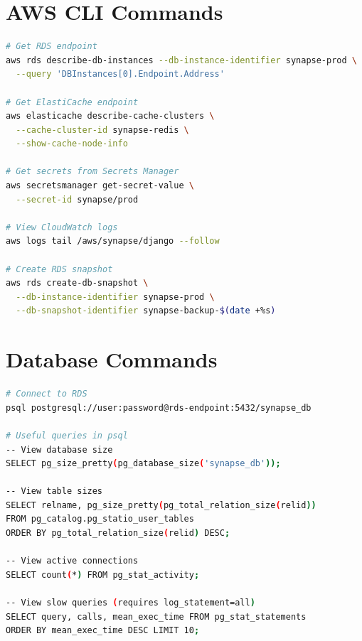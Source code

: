 \documentclass{report}
\begin{document}
\section{AWS CLI Commands}

\begin{lstlisting}[language=bash]
# Get RDS endpoint
aws rds describe-db-instances --db-instance-identifier synapse-prod \
  --query 'DBInstances[0].Endpoint.Address'

# Get ElastiCache endpoint
aws elasticache describe-cache-clusters \
  --cache-cluster-id synapse-redis \
  --show-cache-node-info

# Get secrets from Secrets Manager
aws secretsmanager get-secret-value \
  --secret-id synapse/prod

# View CloudWatch logs
aws logs tail /aws/synapse/django --follow

# Create RDS snapshot
aws rds create-db-snapshot \
  --db-instance-identifier synapse-prod \
  --db-snapshot-identifier synapse-backup-$(date +%s)
\end{lstlisting}

\section{Database Commands}

\begin{lstlisting}[language=bash]
# Connect to RDS
psql postgresql://user:password@rds-endpoint:5432/synapse_db

# Useful queries in psql
-- View database size
SELECT pg_size_pretty(pg_database_size('synapse_db'));

-- View table sizes
SELECT relname, pg_size_pretty(pg_total_relation_size(relid))
FROM pg_catalog.pg_statio_user_tables
ORDER BY pg_total_relation_size(relid) DESC;

-- View active connections
SELECT count(*) FROM pg_stat_activity;

-- View slow queries (requires log_statement=all)
SELECT query, calls, mean_exec_time FROM pg_stat_statements
ORDER BY mean_exec_time DESC LIMIT 10;
\end{lstlisting}
\end{document}
